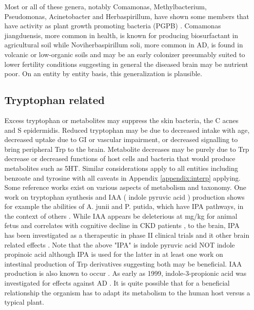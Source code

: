 \documentclass[aps,secnumarabic,balancelastpage,amsmath,amssymb,nofootinbib]{revtex4}
\newcommand{\mjmrefapp}[1]{Appendix   \ref{appendix:#1}}
\begin{document}
Most or all of these genera, notably Comamonas, Methylbacterium, Pseudomonas,
Acinetobacter and Herbaspirillum, have shown some members that have  
activity as 
plant growth promoting bacteria (PGPB) 
\cite{GomezGodinez_AguirreNoyola_MartinezRomero_Look_Plant_2023}.
Comamonas jiangduensis, more common in health, 
is known for producing biosurfactant in
agricultural soil \cite{Sun_Zhang_Chen_Comamonas_jiangduensis_2013}
while Noviherbaspirillum soli, more common in AD, is found in 
volcanic or low-organic soils and may be  an early colonizer presumably
 suited to lower fertility conditions  suggesting in general
the diseased brain may be nutrient poor.
On an entity by entity basis, this generalization is plausible.

\subsection{Tryptophan related}

Excess tryptophan or metabolites may suppress the skin bacteria,
the C acnes and S epidermidis.
Reduced tryptophan may be due to decreased intake
with age, decreased uptake due to GI or vascular
impairment, or decreased signalling to bring peripheral
Trp to the brain. Metabolite decreases may be purely
due to Trp decrease or decreased functions of
host cells and bacteria that would produce metabolites
such as 5HT. 
Similar considerations apply to all entities including benzoate and tyrosine
with all caveats in \mjmrefapp{interp} applying.
Some reference works exist on various aspects of
metabolism and taxonomy. One work on tryptophan
synthesis and IAA ( indole pyruvic acid )  production shows for example
the abilities of A. junii and P. putida,
which have IPA pathways,  in the 
context of others
\cite{SuarezPerez_Bacterial_gene_diversity_related_2020}.
While IAA appears be  deleterious at mg/kg for animal 
fetus
\cite{Furukawa_Abe_Usuda_Indole_Acetic_Acid_2004}
\cite{FURUKAWA200743}
and correlates with cognitive decline in CKD patients
\cite{LIN201985},  to the brain,
IPA has been investigated as a therapeutic in phase II
clinical trials \cite{Politi1999} and it other brain
related effects \cite{Moroni1991}\cite{Bartolini2003}.
Note that the above "IPA" is indole pyruvic acid  NOT indole propinoic
acid although IPA is used for the latter in at least one work on intestinal
production of Trp derivatives suggesting both may be beneficial.
IAA production is also known to occur
\cite{PMC8972051}. As early as 1999, indole-3-propionic acid
was investigated for effects against AD \cite{Chyan_Poeggeler_Omar_Potent_Neuroprotective_Properties_against_1999}.
It is quite possible that for a beneficial relationship
the organism has to adapt its metabolism to the human host
versus a typical plant.
\end{document}
